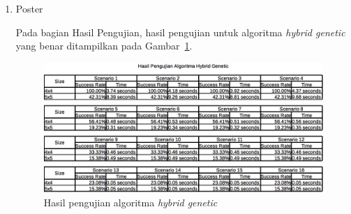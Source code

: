 \documentclass[11pt,a4paper,twoside,openright]{article}
\begin{document}
\begin{enumerate}
\item Poster

Pada bagian Hasil Pengujian, hasil pengujian untuk algoritma \textit{hybrid genetic} yang benar ditampilkan pada Gambar~\ref{fig:gambar1}.

\begin{figure}
\centering
\captionsetup{justification=centering}
\includegraphics[scale=0.5]{HasilPengujianHG.png}
\caption[Hasil pengujian algoritma \textit{hybrid genetic}]{Hasil pengujian algoritma \textit{hybrid genetic}}
\label{fig:gambar1}
\end{figure}

\end{enumerate}
\end{document}
